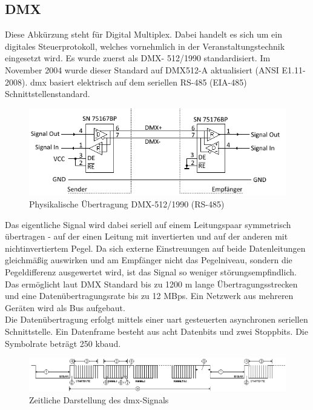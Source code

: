 \documentclass[11pt]{scrartcl}
\begin{document}
\subsection{DMX}
Diese Abkürzung steht für Digital Multiplex. Dabei handelt es sich um ein digitales Steuerprotokoll,
welches vornehmlich in der Veranstaltungstechnik eingesetzt wird. Es wurde zuerst als DMX-
512/1990 standardisiert. Im November 2004 wurde dieser Standard auf DMX512-A aktualisiert
(ANSI E1.11-2008). \ac{dmx} basiert elektrisch auf dem seriellen RS-485 (EIA-485)
Schnittstellenstandard.
\begin{figure}[H]
    \begin{center}
        \includegraphics[width=.75\textwidth]{images/dmx.png}
    \end{center}
    \vspace{-.5cm}
    \caption{Physikalische Übertragung DMX-512/1990 (RS-485) \cite{soundlight}}
\end{figure}
\vspace{-.3cm}
\noindent
Das eigentliche Signal wird dabei seriell auf einem Leitungspaar symmetrisch übertragen - auf der
einen Leitung mit invertierten und auf der anderen mit nichtinvertiertem Pegel. Da sich externe 
Einstreuungen auf beide Datenleitungen gleichmäßig auswirken und am Empfänger nicht das Pegelniveau,
sondern die Pegeldifferenz ausgewertet wird, ist das Signal so weniger störungsempfindlich.
Das ermöglicht laut DMX Standard \cite{dmxstandard} bis zu 1200 m lange Übertragungsstrecken und eine
Datenübertragungsrate bis zu 12 \ac{MBps}. Ein Netzwerk aus mehreren Geräten wird als Bus aufgebaut.\\
Die Datenübertragung erfolgt mittels einer \ac{uart} gesteuerten asynchronen seriellen Schnittstelle. Ein
Datenframe besteht aus acht Datenbits und zwei Stoppbits. Die Symbolrate beträgt 250 k\ac{baud}.
\begin{figure}[H]
    \includegraphics[width=\textwidth]{images/DMX_zeitlich.png}
    \caption{Zeitliche Darstellung des \ac{dmx}-Signals \cite{soundlightA}} \label{fig:DMXoverTime}
\end{figure}
\end{document}
